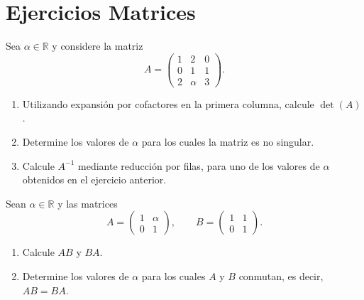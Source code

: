 \documentclass[11pt,a5]{aleph-examen}
\begin{document}
\encabezado

\section*{Ejercicios Matrices}

\begin{preguntas}

\item
Sea \( \alpha \in \mathbb{R} \) y considere la matriz
\[
    A=\begin{pmatrix}
        1 & 2 & 0 \\
        0 & 1 & 1 \\
        2 & \alpha & 3
    \end{pmatrix}.
\]

\begin{enumerate}
    \item Utilizando expansión por cofactores en la primera columna, calcule \( \det(A) \).
    \item Determine los valores de \( \alpha \) para los cuales la matriz es no singular.
    \item Calcule \( A^{-1} \) mediante reducción por filas, para uno de los valores de $\alpha$ obtenidos en el ejercicio anterior.
\end{enumerate}

\item
Sean \( \alpha \in \mathbb{R} \) y las matrices
\[
    A=\begin{pmatrix}
        1 & \alpha \\
        0 & 1
    \end{pmatrix},
    \qquad
    B=\begin{pmatrix}
        1 & 1 \\
        0 & 1
    \end{pmatrix}.
\]

\begin{enumerate}
    \item Calcule \( AB \) y \( BA \).
    \item Determine los valores de \( \alpha \) para los cuales \( A \) y \( B \) conmutan, es decir, \( AB=BA \).
\end{enumerate}

\end{preguntas}
\end{document}
